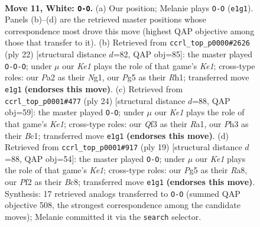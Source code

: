 \documentclass[11pt]{article}
\begin{document}
\clearpage

\begin{figure}[p]\centering
\begin{subfigure}{0.46\textwidth}\centering
\resizebox{\linewidth}{!}{%
\newchessgame
\chessboard[
  setfen={rn2kbnr/pp2qpp1/2p5/3p2Pp/3P4/2N2Q1P/PPP1BP2/R1B1K2R w KQkq - 3 11},
  showmover=false,
  pgfstyle=straightmove, color=movearrow, markmove={e1-g1}
]}
\caption{}
\end{subfigure}\hfill
\begin{subfigure}{0.46\textwidth}\centering
\resizebox{\linewidth}{!}{%
\newchessgame
\chessboard[
  setfen={r1bqk2r/pp2p1b1/2n3p1/3p1pBn/3P3P/2NQ1P2/PPP5/R3KBNR w KQkq - 1 12},
  showmover=false,
  pgfstyle=straightmove, color=movearrow, markmove={e1-c1}
]}
\caption{}
\end{subfigure}
\\[4pt]
\begin{subfigure}{0.46\textwidth}\centering
\resizebox{\linewidth}{!}{%
\newchessgame
\chessboard[
  setfen={r3kbnr/pp1n1ppp/1q2p3/3pP3/3P4/1P4N1/1P1QBPPP/R1B1K2R w KQkq - 1 13},
  showmover=false,
  pgfstyle=straightmove, color=movearrow, markmove={e1-g1}
]}
\caption{}
\end{subfigure}\hfill
\begin{subfigure}{0.46\textwidth}\centering
\resizebox{\linewidth}{!}{%
\newchessgame
\chessboard[
  setfen={r1b1k2r/1pp1bppp/3q1n2/pP1p4/8/P3PN2/1BP2PPP/R2QKB1R b KQkq - 0 10},
  showmover=false,
  pgfstyle=straightmove, color=movearrow, markmove={e8-g8}
]}
\caption{}
\end{subfigure}
\caption{\textbf{Move 11, White: \texttt{O-O}.} (a) Our position; Melanie plays \texttt{O-O} (\texttt{e1g1}). Panels (b)--(d) are the retrieved master positions whose correspondence most drove this move (highest QAP objective among those that transfer to it). (b) Retrieved from \texttt{ccrl\_top\_p0000\#2626} (ply 22) [structural distance $d$=82, QAP obj=85]: the master played \texttt{O-O-O}; under $\mu$ our \emph{Ke1} plays the role of that game's \emph{Ke1}; cross-type roles: our \emph{P}a2 as their \emph{N}g1, our \emph{P}g5 as their \emph{R}h1; transferred move \texttt{e1g1} \textbf{(endorses this move)}. (c) Retrieved from \texttt{ccrl\_top\_p0001\#477} (ply 24) [structural distance $d$=88, QAP obj=59]: the master played \texttt{O-O}; under $\mu$ our \emph{Ke1} plays the role of that game's \emph{Ke1}; cross-type roles: our \emph{Q}f3 as their \emph{R}a1, our \emph{P}h3 as their \emph{B}c1; transferred move \texttt{e1g1} \textbf{(endorses this move)}. (d) Retrieved from \texttt{ccrl\_top\_p0001\#917} (ply 19) [structural distance $d$=88, QAP obj=54]: the master played \texttt{O-O}; under $\mu$ our \emph{Ke1} plays the role of that game's \emph{Ke1}; cross-type roles: our \emph{P}g5 as their \emph{R}a8, our \emph{P}f2 as their \emph{B}c8; transferred move \texttt{e1g1} \textbf{(endorses this move)}. Synthesis: 17 retrieved analogs transferred to \texttt{O-O} (summed QAP objective 508, the strongest correspondence among the candidate moves); Melanie committed it via the \texttt{search} selector.}
\label{fig:thought-m20}
\end{figure}
\end{document}
